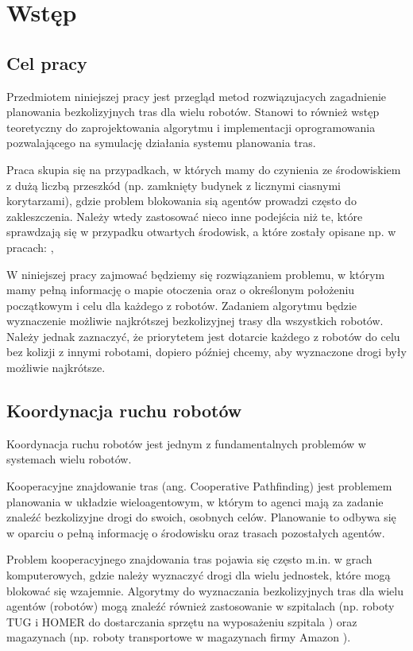 \chapter{Wstęp}
\label{ch:wstep}

\section{Cel pracy}
Przedmiotem niniejszej pracy jest przegląd metod rozwiązujacych zagadnienie planowania bezkolizyjnych tras dla wielu robotów. Stanowi to również wstęp teoretyczny do zaprojektowania algorytmu i implementacji oprogramowania pozwalającego na symulację działania systemu planowania tras.

Praca skupia się na przypadkach, w których mamy do czynienia ze środowiskiem z dużą liczbą przeszkód (np. zamknięty budynek z licznymi ciasnymi korytarzami), gdzie problem blokowania sią agentów prowadzi często do zakleszczenia. Należy wtedy zastosować nieco inne podejścia niż te, które sprawdzają się w przypadku otwartych środowisk, a które zostały opisane np. w pracach: \cite{roszkowska}, \cite{siemiatkowska}

W niniejszej pracy zajmować będziemy się rozwiązaniem problemu, w którym mamy pełną informację o mapie otoczenia oraz o określonym położeniu początkowym i celu dla każdego z robotów. Zadaniem algorytmu będzie wyznaczenie możliwie najkrótszej bezkolizyjnej trasy dla wszystkich robotów. Należy jednak zaznaczyć, że priorytetem jest dotarcie każdego z robotów do celu bez kolizji z innymi robotami, dopiero później chcemy, aby wyznaczone drogi były możliwie najkrótsze.

\section{Koordynacja ruchu robotów}
Koordynacja ruchu robotów jest jednym z fundamentalnych problemów w systemach wielu robotów. \cite{optpriorities}

Kooperacyjne znajdowanie tras (ang. Cooperative Pathfinding) jest problemem planowania w układzie wieloagentowym, w którym to agenci mają za zadanie znaleźć bezkolizyjne drogi do swoich, osobnych celów. Planowanie to odbywa się w oparciu o pełną informację o środowisku oraz trasach pozostałych agentów. \cite{cooppath}

Problem kooperacyjnego znajdowania tras pojawia się często m.in. w grach komputerowych, gdzie należy wyznaczyć drogi dla wielu jednostek, które mogą blokować się wzajemnie. Algorytmy do wyznaczania bezkolizyjnych tras dla wielu agentów (robotów) mogą znaleźć również zastosowanie w szpitalach (np. roboty TUG i HOMER do dostarczania sprzętu na wyposażeniu szpitala \cite{tughomer}) oraz magazynach (np. roboty transportowe w magazynach firmy Amazon \cite{amazonrobots}).

